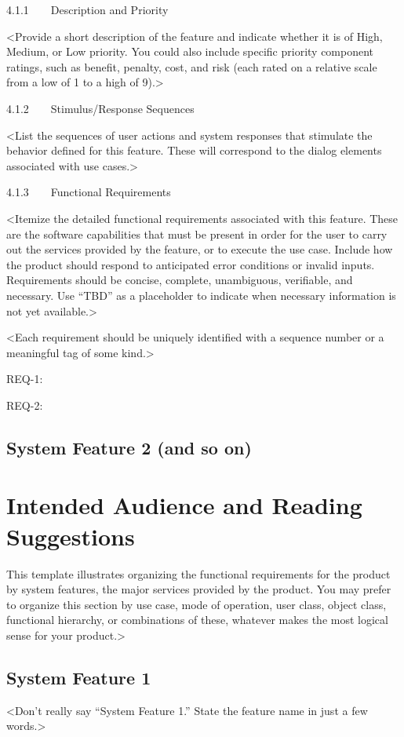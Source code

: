 \documentclass{scrreprt}
\begin{document}
4.1.1    Description and Priority

<Provide a short description of the feature and indicate whether it is of High, Medium, or Low priority. You could also include specific priority component ratings, such as benefit, penalty, cost, and risk (each rated on a relative scale from a low of 1 to a high of 9).>

4.1.2    Stimulus/Response Sequences

<List the sequences of user actions and system responses that stimulate the behavior defined for this feature. These will correspond to the dialog elements associated with use cases.>

4.1.3    Functional Requirements

<Itemize the detailed functional requirements associated with this feature. These are the software capabilities that must be present in order for the user to carry out the services provided by the feature, or to execute the use case. Include how the product should respond to anticipated error conditions or invalid inputs. Requirements should be concise, complete, unambiguous, verifiable, and necessary. Use “TBD” as a placeholder to indicate when necessary information is not yet available.>

<Each requirement should be uniquely identified with a sequence number or a meaningful tag of some kind.>

REQ-1:

REQ-2:

\subsection*{System Feature 2 (and so on)}
    \section{Intended Audience and Reading Suggestions}
    This template illustrates organizing the functional requirements for the product by system features, the major services provided by the product. You may prefer to organize this section by use case, mode of operation, user class, object class, functional hierarchy, or combinations of these, whatever makes the most logical sense for your product.>

\subsection*{System Feature 1}

<Don’t really say “System Feature 1.” State the feature name in just a few words.>
\end{document}
